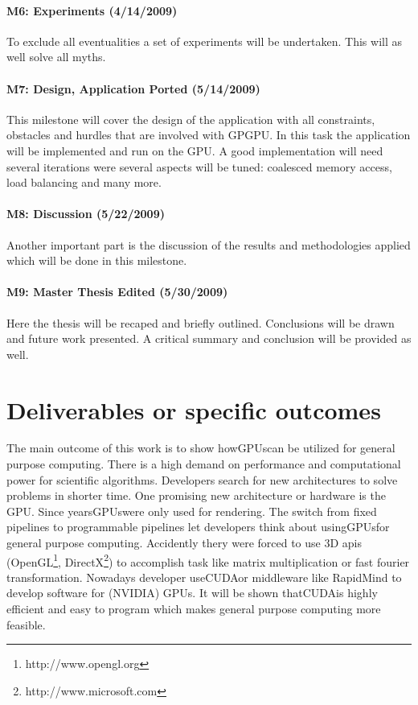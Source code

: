 \paragraph{M6: Experiments (4/14/2009)} %
\label{par:m6_experiments}
To exclude all eventualities a set of experiments will be undertaken. This will 
as well solve all myths.
\paragraph{M7: Design, Application Ported (5/14/2009)} %
\label{par:m7_design_application_ported}
This milestone will cover the design of the application with all constraints,
obstacles and hurdles that are involved with GPGPU. In this task the application
will be implemented and run on the GPU. A good implementation will need several
iterations were several aspects will be tuned: coalesced memory access, load
balancing and many more.
\paragraph{M8: Discussion (5/22/2009)} %
\label{par:m8_discussion}
Another important part is the discussion of the results and methodologies
applied which will be done in this milestone.

\paragraph{M9: Master Thesis Edited (5/30/2009)} %
\label{par:master_thesis_edited}
Here the thesis will be recaped and briefly outlined. Conclusions will be drawn
and future work presented. A critical summary and conclusion will be provided as
well. %

\section*{Deliverables or specific outcomes} 
\label{sub:deliverables_or_specific_outcomes} 
The main outcome of this work is to show how\glspl{GPU}can be utilized for general
purpose computing. There is a high demand on performance and computational power
for scientific algorithms. Developers search for new architectures to solve
problems in shorter time. One promising new architecture or hardware is the GPU.
Since years\glspl{GPU}were only used for rendering. The switch from fixed pipelines
to programmable pipelines let developers think about using\glspl{GPU}for general
purpose computing. Accidently thery were forced to use 3D apis
(OpenGL\footnote{http://www.opengl.org},
DirectX\footnote{http://www.microsoft.com}) to accomplish task like matrix
multiplication or fast fourier transformation. Nowadays developer use\gls{CUDA}or
middleware like RapidMind to develop software for (NVIDIA) GPUs. It will be
shown that\gls{CUDA}is highly efficient and easy to program which makes general
purpose computing more feasible.

